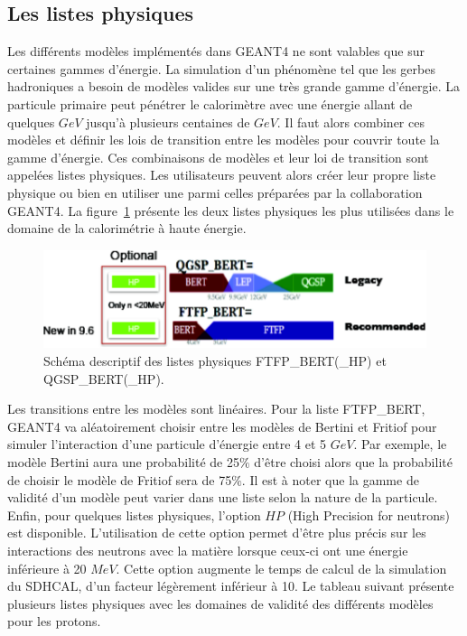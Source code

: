\subsection{Les listes physiques}
\label{sec.listPhys}
Les différents modèles implémentés dans GEANT4 ne sont valables que sur certaines gammes d'énergie. La simulation d'un phénomène tel que les gerbes hadroniques a besoin de modèles valides sur une très grande gamme d'énergie. La particule primaire peut pénétrer le calorimètre avec une énergie allant de quelques $GeV$ jusqu'à plusieurs centaines de $GeV$. Il faut alors combiner ces modèles et définir les lois de transition entre les modèles pour couvrir toute la gamme d'énergie. Ces combinaisons de modèles et leur loi de transition sont appelées listes physiques. Les utilisateurs peuvent alors créer leur propre liste physique ou bien en utiliser une parmi celles préparées par la collaboration GEANT4. La figure~\ref{fig.g4list} présente les deux listes physiques les plus utilisées dans le domaine de la calorimétrie à haute énergie. 
\label{sec.listphys}
\begin{figure}[!ht]
  \begin{center}
    \includegraphics[width=.8\textwidth]{Digitizer/figs/physics_list_G4.pdf}
    \caption{Schéma descriptif des listes physiques FTFP\_BERT(\_HP) et QGSP\_BERT(\_HP).}
    \label{fig.g4list}
  \end{center}
\end{figure}
Les transitions entre les modèles sont linéaires. Pour la liste FTFP\_BERT, GEANT4 va aléatoirement choisir entre les modèles de Bertini et Fritiof pour simuler l’interaction d'une particule d'énergie entre 4 et 5 $GeV$. Par exemple, le modèle Bertini aura une probabilité de 25$\%$ d'être choisi alors que la probabilité de choisir le modèle de Fritiof sera de 75$\%$. Il est à noter que la gamme de validité d'un modèle peut varier dans une liste selon la nature de la particule. Enfin, pour quelques listes physiques, l'option $HP$ (High Precision for neutrons) est disponible. L'utilisation de cette option permet d'être plus précis sur les interactions des neutrons avec la matière lorsque ceux-ci ont une énergie inférieure à 20 $MeV$. Cette option augmente le temps de calcul de la simulation du SDHCAL, d'un facteur légèrement inférieur à 10. Le tableau suivant présente plusieurs listes physiques avec les domaines de validité des différents modèles pour les protons.
